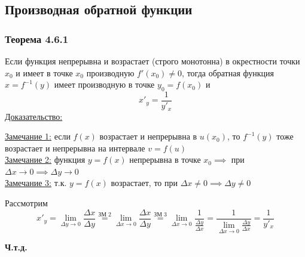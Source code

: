 \documentclass[12pt]{article}
\begin{document}
    \subsection{Производная обратной функции}
    \subsubsection*{Теорема 4.6.1}\label{th:4.6.1}
    Если функция непрерывна и возрастает (строго монотонна) в окрестности точки $x_0$ и имеет в точке $x_0$ производную $f'(x_0) \ne 0$, тогда обратная функция $x = f^{-1}(y)$ имеет производную в точке $y_0 = f(x_0)$ и \[ x'_y = \frac{1}{y'_x} \]
    \underline{Доказательство:}
    \begin{adjustwidth}{1.5em}{1.5em}
        \underline{Замечание 1:} если $f(x)$ возрастает и непрерывна в $u(x_0)$, то $f^{-1}(y)$ тоже возрастает и непрерывна на интервале $v = f(u)$\\
        \underline{Замечание 2:} функция $y = f(x)$ непрерывна в точке $x_0 \implies$ при $\Delta x \to 0 \implies \Delta y \to 0$\\
        \underline{Замечание 3:} т.к. $y = f(x)$ возрастает, то при $\Delta x \ne 0 \implies \Delta y \ne 0$\par\noindent
        Рассмотрим
        \[ x'_y = \lim_{\Delta y \to 0}\frac{\Delta x}{\Delta y} \overset{\text{ЗМ 2}}{=} \lim_{\Delta x \to 0}\frac{\Delta x}{\Delta y} \overset{\text{ЗМ 3}}{=} \lim_{\Delta x \to 0} \frac{1}{\frac{\Delta y}{\Delta x}} = \frac{1}{\lim_{\Delta x \to 0}\frac{\Delta y}{\Delta x}} = \frac{1}{y'_x} \]
        \begin{center}
            \textbf{Ч.т.д.}
        \end{center}
    \end{adjustwidth}
\end{document}

